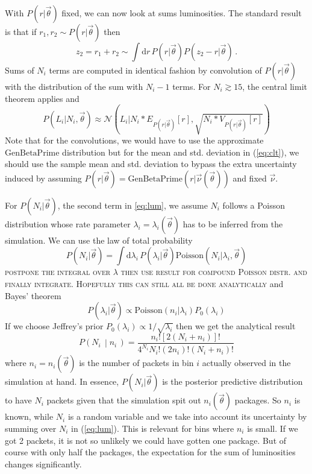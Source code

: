 \documentclass[a4,12pt]{article}
\newcommand{\given}[2]{\left(#1\, \middle| #2 \, \right)}
\newcommand{\gaussian}{\ensuremath{\mathcal{N}}}
\newcommand{\genbetapr}{\ensuremath{\mathrm{GenBetaPrime}}}
\newcommand{\Lumi}{\ensuremath{L_i}}
\newcommand{\poisson}{\ensuremath{\mathrm{Poisson}}}
\newcommand{\rmdx}[1]{\mbox{d} #1 \,} %
\newcommand{\vecnu}{\ensuremath{\vec{\nu}}}
\newcommand{\vecth}{\ensuremath{{\vec{\theta}}}}
\def \refeq#1{(\ref{eq:#1})}
\newcommand{\todo}[1]{{\textsc{\color{red}#1}}}
\begin{document}
With $P(r|\vecth)$ fixed, we can now look at sums luminosities. The
standard result is that if $r_1, r_2 \sim P(r|\vecth)$ then
\begin{equation}
  \label{eq:convolution}
  z_2 = r_1 + r_2 \sim \int \rmdx{r} P(r|\vecth) P(z_2 - r|\vecth) \,.
\end{equation}
Sums of $N_i$ terms are computed in identical fashion by convolution
of $P(r|\vecth)$ with the distribution of the sum with $N_i-1$
terms. For $N_i \gtrsim 15$, the central limit theorem applies and
\begin{equation}
  \label{eq:clt}
  P(\Lumi | N_i, \vecth) \approx \gaussian \left(\Lumi | N_i * E_{P(r|\vecth)}[r], \sqrt{N_i * V_{P(r|\vecth)}[r]} \right)
\end{equation}
Note that for the convolutions, we would have to use the approximate
\genbetapr{} distribution but for the mean and std. deviation in
\refeq{clt}, we should use the sample mean and std. deviation to
bypass the extra uncertainty induced by assuming $P(r | \vecth) =
\genbetapr(r | \vecnu(\vecth))$ and fixed $\vecnu$.

For $P(N_i | \vecth)$, the second term in \eqref{eq:lum}, we assume
$N_i$ follows a Poisson distribution whose rate parameter $\lambda_i =
\lambda_i(\vecth)$ has to be inferred from the simulation. We can use
the law of total probability
\begin{equation}
  P(N_i | \vecth) = \int \rmdx{\lambda_i} P(\lambda_i | \vecth) \poisson(N_i | \lambda_i, \vecth)
\end{equation}
\todo{postpone the integral over $\lambda$ then use result for
  compound Poisson distr. and finally integrate. Hopefully this can
  still all be done analytically} and Bayes' theorem
\begin{equation}
  P(\lambda_i | \vecth) \propto \poisson(n_i | \lambda_i) P_0(\lambda_i)
\end{equation}
If we choose Jeffrey's prior $P_0(\lambda_i) \propto
1/\sqrt{\lambda_i}$ then we get the analytical
result~\cite[Eq. 5]{Aggarwal:2011aa}
\begin{equation}
  P\given{N_i}{n_i} = \frac{n_i! [2 (N_i + n_i)]!}{4^{N_i} N_i! (2 n_i)! (N_i + n_i)!}
\end{equation}
where $n_i = n_i(\vecth)$ is the number of packets in bin $i$ actually
observed in the simulation at hand.  In essence, $P(N_i | \vecth)$ is
the posterior predictive distribution to have $N_i$ packets given that
the simulation spit out $n_i(\vecth)$ packages. So $n_i$ is known,
while $N_i$ is a random variable and we take into account its
uncertainty by summing over $N_i$ in \refeq{lum}. This is relevant for bins where $n_i$ is small. If we got
2 packets, it is not so unlikely we could have gotten one package. But
of course with only half the packages, the expectation for the sum of
luminosities changes significantly.
\end{document}
